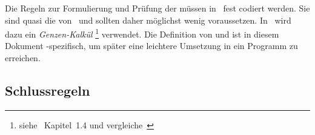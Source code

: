 Die Regeln zur Formulierung und Prüfung der  müssen in \ASBA\ fest codiert werden.
Sie sind quasi die  von \ASBA\ und sollten daher möglichst wenig voraussetzen.
In \ASBA\ wird dazu ein \emph{Genzen-Kalkül}%
\footnote{%
	siehe~\cite{bib:Rautenberg} Kapitel~1.4 und vergleiche~\cite{bib:Schlussregel,bib:NatuerlichesSchliessen}
} verwendet.
Die Definition von \emph{} und \emph{} ist in diesem Dokument \ASBA-spezifisch, um später eine leichtere Umsetzung in ein Programm zu erreichen.

\subsection{Schlussregeln}%
\label{sub:Schlussregeln}


